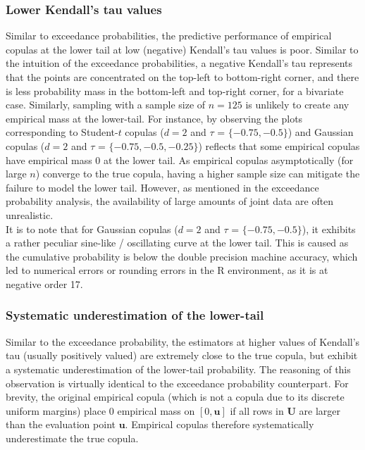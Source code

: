\documentclass[12pt]{report}
\newcommand{\1}{\mathbf{1}}
\begin{document}
\begin{flushleft}
\subsubsection{Lower Kendall's tau values}
Similar to exceedance probabilities, the predictive performance of empirical copulas at the lower tail at low (negative) Kendall's tau values is poor. Similar to the intuition of the exceedance probabilities, a negative Kendall's tau represents that the points are concentrated on the top-left to bottom-right corner, and there is less probability mass in the bottom-left and top-right corner, for a bivariate case. Similarly, sampling with a sample size of $n = 125$ is unlikely to create any empirical mass at the lower-tail. For instance, by observing the plots corresponding to Student-$t$ copulas ($d = 2$ and $\tau$ = $\{ -0.75, -0.5 \}$) and Gaussian copulas ($d = 2$ and $\tau$ = $\{-0.75, -0.5, -0.25\}$) reflects that some empirical copulas have empirical mass 0 at the lower tail. As empirical copulas asymptotically (for large $n$) converge to the true copula, having a higher sample size can mitigate the failure to model the lower tail. However, as mentioned in the exceedance probability analysis, the availability of large amounts of joint data are often unrealistic.\\
\vspace{0.5cm}
It is to note that for Gaussian copulas ($d = 2$ and $\tau$ = $\{-0.75, -0.5\}$), it exhibits a rather peculiar sine-like / oscillating curve at the lower tail. This is caused as the cumulative probability is below the double precision machine accuracy, which led to numerical errors or rounding errors in the R environment, as it is at negative order 17.
\subsubsection{Systematic underestimation of the lower-tail}
Similar to the exceedance probability, the estimators at higher values of Kendall's tau (usually positively valued) are extremely close to the true copula, but exhibit a systematic underestimation of the lower-tail probability. The reasoning of this observation is virtually identical to the exceedance probability counterpart. For brevity, the original empirical copula (which is not a copula due to its discrete uniform margins) place 0 empirical mass on $[0,\boldsymbol{u}]$ if all rows in $\boldsymbol{U}$ are larger than the evaluation point $\boldsymbol{u}$. Empirical copulas therefore systematically underestimate the true copula. \\

\end{flushleft}
\end{document}
